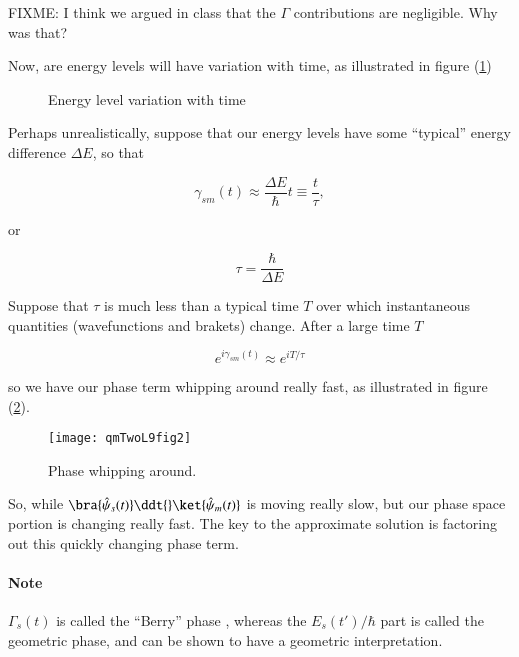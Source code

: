 FIXME: I think we argued in class that the $\Gamma$ contributions are negligible.  Why was that?

Now, are energy levels will have variation with time, as illustrated in figure (\ref{fig:qmTwoL9fig1})

\begin{figure}[htp]
   \centering
   \def\svgwidth{0.3\columnwidth}
   
   \caption{Energy level variation with time}\label{fig:qmTwoL9fig1}
\end{figure}

Perhaps unrealistically, suppose that our energy levels have some ``typical'' energy difference $\Delta E$, so that

\begin{equation}\label{eqn:qmTwoL9:230}
\gamma_{sm}(t) \approx \frac{\Delta E}{\hbar} t \equiv \frac{t}{\tau},
\end{equation}

or

\begin{equation}\label{eqn:qmTwoL9:250}
\tau = \frac{\hbar}{\Delta E}
\end{equation}

Suppose that $\tau$ is much less than a typical time $T$ over which instantaneous quantities (wavefunctions and brakets) change.  After a large time $T$

\begin{equation}\label{eqn:qmTwoL9:270}
e^{i \gamma_{sm}(t)} \approx e^{i T/\tau}
\end{equation}

so we have our phase term whipping around really fast, as illustrated in figure (\ref{fig:qmTwoL9fig2}).

\begin{figure}[htp]
   \centering
   \texttt{[image: qmTwoL9fig2]}
   \caption{Phase whipping around.}\label{fig:qmTwoL9fig2}
\end{figure}

So, while $\bra{\hat{\psi}_s(t)} \ddt{} \ket{\hat{\psi}_m(t)}$ is moving really slow, but our phase space portion is changing really fast.  The key to the approximate solution is factoring out this quickly changing phase term.

\paragraph{Note} $\Gamma_s(t)$ is called the ``Berry'' phase \cite{wiki:GeometricPhase}, whereas the $E_s(t')/\hbar$ part is called the geometric phase, and can be shown to have a geometric interpretation.

